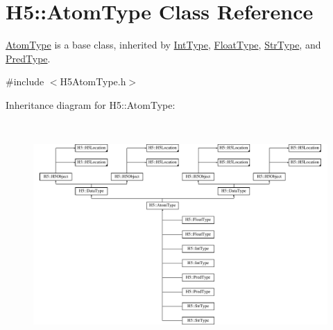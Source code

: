 \hypertarget{class_h5_1_1_atom_type}{}\section{H5\+:\+:Atom\+Type Class Reference}
\label{class_h5_1_1_atom_type}


\hyperlink{class_h5_1_1_atom_type}{Atom\+Type} is a base class, inherited by \hyperlink{class_h5_1_1_int_type}{Int\+Type}, \hyperlink{class_h5_1_1_float_type}{Float\+Type}, \hyperlink{class_h5_1_1_str_type}{Str\+Type}, and \hyperlink{class_h5_1_1_pred_type}{Pred\+Type}.  




{\ttfamily \#include $<$H5\+Atom\+Type.\+h$>$}

Inheritance diagram for H5\+:\+:Atom\+Type\+:\begin{figure}[H]
\begin{center}
\leavevmode
\includegraphics[height=8.584906cm]{class_h5_1_1_atom_type}
\end{center}
\end{figure}
